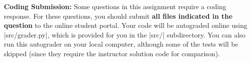 {\bf Coding Submission:}
Some questions in this assignment require a coding response.  For these questions, you should submit \textbf{all files indicated in the question} to the online student portal.  Your code will be autograded online using |src/grader.py|, which is provided for you in the |src/|
subdirectory. You can also run this autograder on your local computer, although some of the tests will be skipped (since they
require the instructor solution code for comparison).